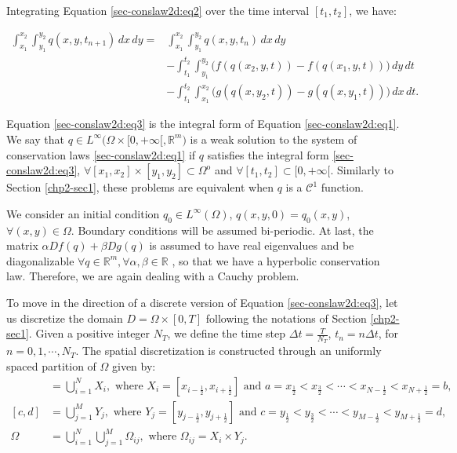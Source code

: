 Integrating Equation \eqref{sec-conslaw2d:eq2} over the time interval $[t_1,t_2]$, 
we have:

\begin{align}
	\label{sec-conslaw2d:eq3}
	\int_{x_1}^{x_2} \int_{y_1}^{y_2}
	{q}(x, y, t_{n+1}) \,dx \,dy = &\int_{x_1}^{x_2} \int_{y_1}^{y_2}
	{q}(x, y, t_n) \,dx \,dy \\ \nonumber
	&-\int_{t_1}^{t_2} \int_{y_1}^{y_2} \bigg({f}({q}(x_2, y, t))
	-{f}({q}(x_1, y, t)) \bigg) \,dy \,dt\\ \nonumber
	&-\int_{t_1}^{t_2} \int_{x_1}^{x_2} \bigg({g}({q}(x, y_2, t))
	-{g}({q}(x, y_1, t)) \bigg) \,dx \,dt.
\end{align}

Equation \eqref{sec-conslaw2d:eq3} is the integral form of Equation 
\eqref{sec-conslaw2d:eq1}. We say that ${q} \in 
L^{\infty}{(\Omega \times [0, +\infty[}, \mathbb{R}^m)$ is a weak
solution to the system of conservation laws  \eqref{sec-conslaw2d:eq1} if ${q}$
satisfies the integral form \eqref{sec-conslaw2d:eq3}, 
$\forall [x_1,x_2]\times[y_1,y_2] \subset \Omega^{\mathrm{o}}$ and 
$\forall [t_1,t_2] \subset [0,+\infty[$.
Similarly to Section \ref{chp2-sec1}, these problems are equivalent
when  ${q}$ is a $\mathcal{C}^1$ function.

We consider an initial condition ${q_0} \in L^{\infty}{(\Omega)}$,
${q}(x,y,0) =  {q_0}(x,y)$, $\forall (x,y) \in \Omega$.
Boundary conditions will be assumed bi-periodic.
At last, the matrix $\alpha D{f}(q) + \beta D{g}(q)$ is assumed to have
real eigenvalues and be diagonalizable
$\forall q \in \mathbb{R}^m , \forall \alpha, \beta \in \mathbb{R}$
\citep{leveque:1990}, so that we have a hyperbolic conservation law.
Therefore, we are again dealing with a Cauchy problem. 

To move in the direction of a discrete version of Equation \eqref{sec-conslaw2d:eq3},
let us discretize the domain $D = \Omega \times [0,T]$ following 
the notations of Section \ref{chp2-sec1}.
Given a positive integer $N_T$, we define the time step 
$\Delta t = \frac{T}{N_T}$, $t_n = n \Delta t$, for $n = 0, 1 ,\cdots, N_T$.
The spatial discretization is constructed through an uniformly spaced partition of $\Omega$ given by:
\begin{align}
	[a,b] &= \bigcup_{i=1}^N X_i, 
	\text{ where } X_i= [x_{i-\frac{1}{2}}, x_{i+\frac{1}{2}}] \text{ and } 
	a = x_{\frac{1}{2}} < x_{\frac{3}{2}} < \cdots < x_{N-\frac{1}{2}} < x_{N+\frac{1}{2}} = b, \\
	[c,d] &= \bigcup_{j=1}^M Y_j, 
\text{ where } Y_j= [y_{j-\frac{1}{2}}, y_{j+\frac{1}{2}}] \text{ and } 
	c = y_{\frac{1}{2}} < y_{\frac{3}{2}} < \cdots < y_{M-\frac{1}{2}} < y_{M+\frac{1}{2}} = d, \\
    \Omega &=  \bigcup_{i=1}^N \bigcup_{j=1}^M \Omega_{ij}, \text{ where } \Omega_{ij} = X_i \times Y_j.
\end{align}

